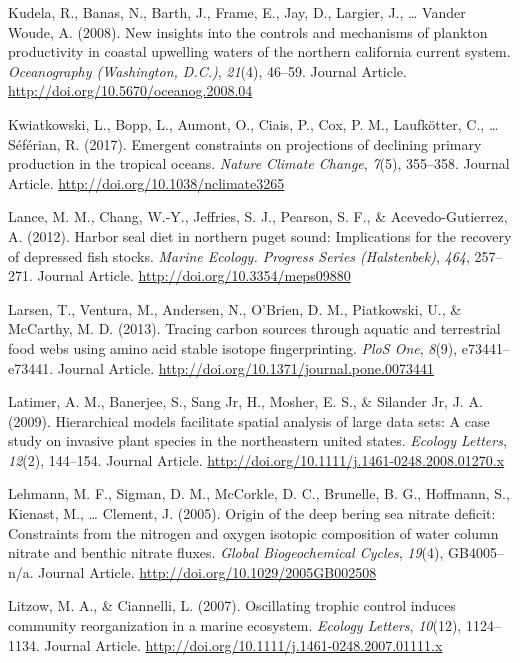 \documentclass [11pt, proquest] {uwthesis}[2015/03/03]
\begin{document}
\hypertarget{ref-Kudela2008}{}
Kudela, R., Banas, N., Barth, J., Frame, E., Jay, D., Largier, J.,
\ldots{} Vander Woude, A. (2008). New insights into the controls and
mechanisms of plankton productivity in coastal upwelling waters of the
northern california current system. \emph{Oceanography (Washington,
D.C.)}, \emph{21}(4), 46--59. Journal Article.
\url{http://doi.org/10.5670/oceanog.2008.04}

\hypertarget{ref-Kwiatkowski2017}{}
Kwiatkowski, L., Bopp, L., Aumont, O., Ciais, P., Cox, P. M.,
Laufkötter, C., \ldots{} Séférian, R. (2017). Emergent constraints on
projections of declining primary production in the tropical oceans.
\emph{Nature Climate Change}, \emph{7}(5), 355--358. Journal Article.
\url{http://doi.org/10.1038/nclimate3265}

\hypertarget{ref-Lance2012}{}
Lance, M. M., Chang, W.-Y., Jeffries, S. J., Pearson, S. F., \&
Acevedo-Gutierrez, A. (2012). Harbor seal diet in northern puget sound:
Implications for the recovery of depressed fish stocks. \emph{Marine
Ecology. Progress Series (Halstenbek)}, \emph{464}, 257--271. Journal
Article. \url{http://doi.org/10.3354/meps09880}

\hypertarget{ref-Larsen2013}{}
Larsen, T., Ventura, M., Andersen, N., O'Brien, D. M., Piatkowski, U.,
\& McCarthy, M. D. (2013). Tracing carbon sources through aquatic and
terrestrial food webs using amino acid stable isotope fingerprinting.
\emph{PloS One}, \emph{8}(9), e73441--e73441. Journal Article.
\url{http://doi.org/10.1371/journal.pone.0073441}

\hypertarget{ref-Latimer2009}{}
Latimer, A. M., Banerjee, S., Sang Jr, H., Mosher, E. S., \& Silander
Jr, J. A. (2009). Hierarchical models facilitate spatial analysis of
large data sets: A case study on invasive plant species in the
northeastern united states. \emph{Ecology Letters}, \emph{12}(2),
144--154. Journal Article.
\url{http://doi.org/10.1111/j.1461-0248.2008.01270.x}

\hypertarget{ref-Lehmann2005}{}
Lehmann, M. F., Sigman, D. M., McCorkle, D. C., Brunelle, B. G.,
Hoffmann, S., Kienast, M., \ldots{} Clement, J. (2005). Origin of the
deep bering sea nitrate deficit: Constraints from the nitrogen and
oxygen isotopic composition of water column nitrate and benthic nitrate
fluxes. \emph{Global Biogeochemical Cycles}, \emph{19}(4), GB4005--n/a.
Journal Article. \url{http://doi.org/10.1029/2005GB002508}

\hypertarget{ref-Litzow2007}{}
Litzow, M. A., \& Ciannelli, L. (2007). Oscillating trophic control
induces community reorganization in a marine ecosystem. \emph{Ecology
Letters}, \emph{10}(12), 1124--1134. Journal Article.
\url{http://doi.org/10.1111/j.1461-0248.2007.01111.x}
\end{document}
